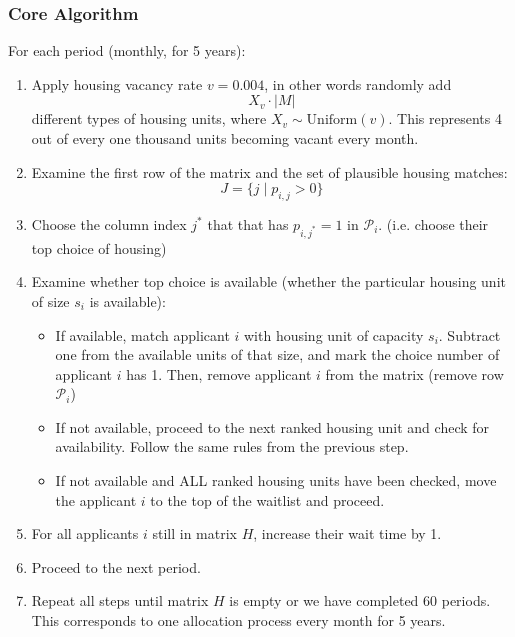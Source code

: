 \documentclass[11pt]{article}
\begin{document}
\subsubsection{Core Algorithm}
\newline
For each period (monthly, for 5 years):
\begin{enumerate}
    \item Apply housing vacancy rate $v=0.004$, in other words randomly add
    \[X_v \cdot |M|\]
    different types of housing units, 
    where $X_v \sim \text{Uniform}(v)$. This represents 4 out of every one thousand units becoming vacant every month.
    \item Examine the first row of the matrix and the set of plausible housing matches:
    \[J = \{j \mid p_{i,j} > 0\}\]
    \item Choose the column index $j^*$ that that has $p_{i,j^*} = 1$ in $\mathcal{P}_i$. (i.e. choose their top choice of housing)
    \item Examine whether top choice is available (whether the particular housing unit of size $s_i$ is available):
        \begin{itemize}
        \item If available, match applicant $i$ with housing unit of capacity $s_i$. Subtract one from the available units of that size, and mark the choice number of applicant $i$ has 1. Then, remove applicant $i$ from the matrix (remove row $\mathcal{P}_i$)
        \item If not available, proceed to the next ranked housing unit and check for availability. Follow the same rules from the previous step.
        \item If not available and ALL ranked housing units have been checked, move the applicant $i$ to the top of the waitlist and proceed. 
    \end{itemize}
    \item For all applicants $i$ still in matrix $H$, increase their wait time by 1. 
    \item Proceed to the next period. 
    \item Repeat all steps until matrix $H$ is empty or we have completed $60$ periods. This corresponds to one allocation process every month for 5 years.
\end{enumerate}
\end{document}

